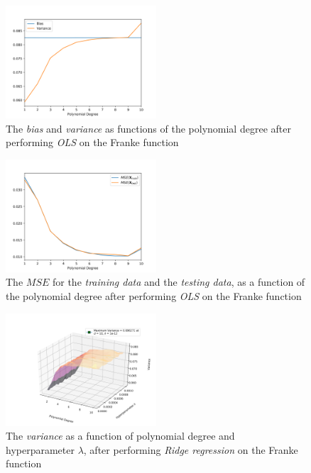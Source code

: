 \documentclass[a4paper,10pt,english]{article}
\begin{document}

\begin{figure}[H]
	\centering 
	\includegraphics[width = 0.5\textwidth, center]{../franke_output/part_C_1.png}
	\caption{The \textit{bias} and \textit{variance} as functions of the polynomial degree after performing \textit{OLS} on the Franke function}
	\label{part_c1}
\end{figure}

\begin{figure}[H]
	\centering 
	\includegraphics[width = 0.5\textwidth, center]{../franke_output/part_C_2.png}
	\caption{The $MSE$ for the \textit{training data} and the \textit{testing data}, as a function of the polynomial degree after performing \textit{OLS} on the Franke function}
	\label{part_c2}
\end{figure}


\begin{figure}[H]
	\centering 
	\includegraphics[width = 0.5\textwidth, center]{../franke_output/part_D_1.png}
	\caption{The \textit{variance} as a function of polynomial degree and hyperparameter $\lambda$, after performing \textit{Ridge regression} on the Franke function}
	\label{part_d1}
\end{figure}
\end{document}
